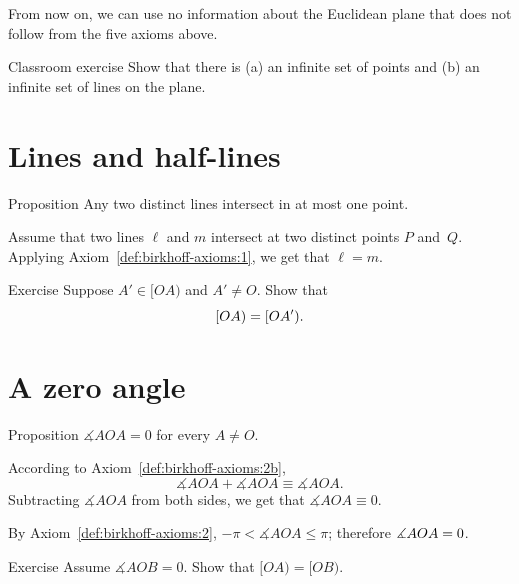 From now on,  
we can use no information about the Euclidean plane that does not follow from the five axioms above.

\begin{thm}{Classroom exercise}\label{ex:infinite}
Show that there is (a) an infinite set of points and (b) an infinite set of lines on the plane.
\end{thm}

\section{Lines and half-lines}

\begin{thm}[\abs]{Proposition}\label{lem:line-line}
\let\thefootnote\relax{}
Any two distinct lines intersect in at most one point.
\end{thm}

Assume that two lines $\ell$ and $m$ intersect at two distinct points $P$ and~$Q$.
Applying Axiom~\ref{def:birkhoff-axioms:1}, we get that $\ell=m$.
\qeds

\begin{thm}{Exercise}\label{ex:[OA)=[OA')}
Suppose $A'\in[OA)$ and $A'\not=O$. 
Show that 
\[[O A)\z=[O A').\]

\end{thm}

\section{A zero angle}

\begin{thm}[\abs]{Proposition}\label{lem:AOA=0}
$\measuredangle A O A= 0$ for every $A\not=O$.
\end{thm}

According to Axiom~\ref{def:birkhoff-axioms:2b},
$$\measuredangle A O A
+
\measuredangle A O A 
\equiv
\measuredangle A O A.$$
Subtracting $\measuredangle A O A$ from both sides, we get that
$\measuredangle A O A \equiv 0$.

By Axiom~\ref{def:birkhoff-axioms:2}, $-\pi<\measuredangle A O A\le \pi$;
therefore $\measuredangle A O A \z= 0$.
\qeds

\begin{thm}[!]{Exercise}\label{ex:[OA)=[OB)}
Assume $\measuredangle A O B= 0$.
Show that $[OA)=[OB)$.
\end{thm}


